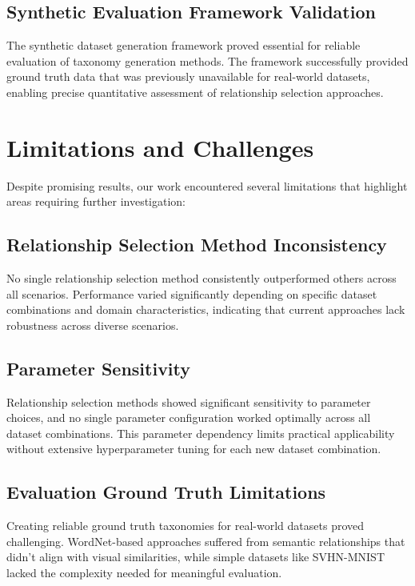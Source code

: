 \subsection{Synthetic Evaluation Framework Validation}

The synthetic dataset generation framework proved essential
for reliable evaluation of taxonomy generation methods.
The framework successfully provided ground truth data
that was previously unavailable for real-world datasets,
enabling precise quantitative assessment of relationship selection approaches.

\section{Limitations and Challenges}

Despite promising results, our work encountered several limitations
that highlight areas requiring further investigation:

\subsection{Relationship Selection Method Inconsistency}

No single relationship selection method consistently outperformed others across all scenarios.
Performance varied significantly depending on specific dataset combinations
and domain characteristics,
indicating that current approaches lack robustness across diverse scenarios.

\subsection{Parameter Sensitivity}

Relationship selection methods showed significant sensitivity to parameter choices,
and no single parameter configuration worked optimally across all dataset combinations.
This parameter dependency limits practical applicability
without extensive hyperparameter tuning for each new dataset combination.

\subsection{Evaluation Ground Truth Limitations}

Creating reliable ground truth taxonomies for real-world datasets proved challenging.
WordNet-based approaches suffered from semantic relationships
that didn't align with visual similarities,
while simple datasets like SVHN-MNIST lacked the complexity needed for meaningful evaluation.

